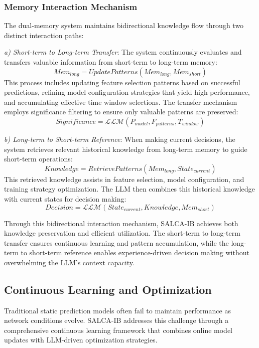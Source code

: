 \documentclass[conference]{IEEEtran}
\begin{document}
\subsubsection{Memory Interaction Mechanism}
The dual-memory system maintains bidirectional knowledge flow through two distinct interaction paths:

\textit{a) Short-term to Long-term Transfer}: The system continuously evaluates and transfers valuable information from short-term to long-term memory:
\begin{equation}
    Mem_{long} = UpdatePatterns(Mem_{long}, Mem_{short})
\end{equation}
This process includes updating feature selection patterns based on successful predictions, refining model configuration strategies that yield high performance, and accumulating effective time window selections. The transfer mechanism employs significance filtering to ensure only valuable patterns are preserved:
\begin{equation}
    Significance = \mathcal{LLM}(P_{model}, F_{patterns}, T_{window})
\end{equation}

\textit{b) Long-term to Short-term Reference}: When making current decisions, the system retrieves relevant historical knowledge from long-term memory to guide short-term operations:
\begin{equation}
    Knowledge = RetrievePatterns(Mem_{long}, State_{current})
\end{equation}
This retrieved knowledge assists in feature selection, model configuration, and training strategy optimization. The LLM then combines this historical knowledge with current states for decision making:
\begin{equation}
    Decision = \mathcal{LLM}(State_{current}, Knowledge, Mem_{short})
\end{equation}

Through this bidirectional interaction mechanism, SALCA-IB achieves both knowledge preservation and efficient utilization. The short-term to long-term transfer ensures continuous learning and pattern accumulation, while the long-term to short-term reference enables experience-driven decision making without overwhelming the LLM's context capacity.

\subsection{Continuous Learning and Optimization}
Traditional static prediction models often fail to maintain performance as network conditions evolve. SALCA-IB addresses this challenge through a comprehensive continuous learning framework that combines online model updates with LLM-driven optimization strategies.
\end{document}
